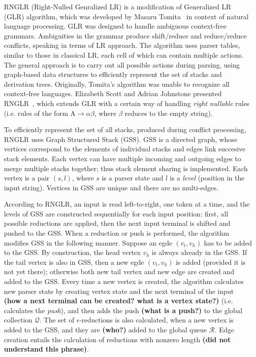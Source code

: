 RNGLR (Right-Nulled Genralized LR) is a modification of Generalized LR (GLR) algorithm, which
was developed by Masaru Tomita~\cite{Tomita} in context of natural language processing. 
GLR was designed to handle ambiguous context-free grammars. Ambiguities in the grammar produce 
shift/reduce and reduce/reduce conflicts, speaking in terms of LR approach. The algorithm 
uses parser tables, similar to those in classical LR, each cell of which can contain multiple 
actions. The general approach is to carry out all possible actions during parsing, 
using graph-based data structures to efficiently represent the set of stacks 
and derivation trees. Originally, Tomita's algorithm was unable to recognize all context-free languages.  
Elizabeth Scott and Adrian Johnstone presented RNGLR~\cite{RNGLR},
which extends GLR with a certain way of handling \emph{right nullable} 
rules (i.e. rules of the form $\mathrm{A} \rightarrow \alpha \beta$, where $\beta$ 
reduces to the empty string). 

To efficiently represent the set of all stacks, produced during conflict processing,
RNGLR uses Graph Structured Stack (GSS). GSS is a directed graph, 
whose vertices correspond to the elements of individual stacks and edges link succesive
stack elements. Each vertex can have multiple incoming and outgoing edges to merge 
multiple stacks together; thus stack element sharing is implemented. Each vertex is 
a pair $(s, l)$, where $s$ is a parser state and $l$ is a \emph{level} (position in the input string). 
Vertices in GSS are unique and there are no multi-edges. 

According to RNGLR, an input is read left-to-right, one token at a time, and 
the levels of GSS are constructed sequentially for each input position: first, all  
possible reductions are applied, then the next input terminal is shifted and
pushed to the GSS. When a reduction or push is performed, 
the algorithm modifies GSS in the following manner. Suppose an 
egde $(v_t, v_h)$ has to be added to the GSS. By construction, the head vertex
$v_h$ is always already in the GSS. If the tail vertex is also in GSS, then
a new egde $(v_t, v_h)$ is added (provided it is not yet there); otherwise both 
new tail vertex and new edge are created and added to the GSS. Every time a new 
vertex is created, the algorithm calculates new parser state by creating vertex 
state and the next terminal of the input {\bf (how a next terminal can be created? what is a vertex state?)}
(i.e. calculates the \emph{push}), and then adds the push {\bf (what is a push?)} to the global 
collection $\mathcal{Q}$. The set of $\epsilon$-reductions 
is also calculated, when a new vertex is added to the GSS, and they are {\bf (who?)} added to the 
global queue $\mathcal{R}$. Edge creation entails the calculation of reductions with 
nonzero length {\bf (did not understand this phrase)}. 

